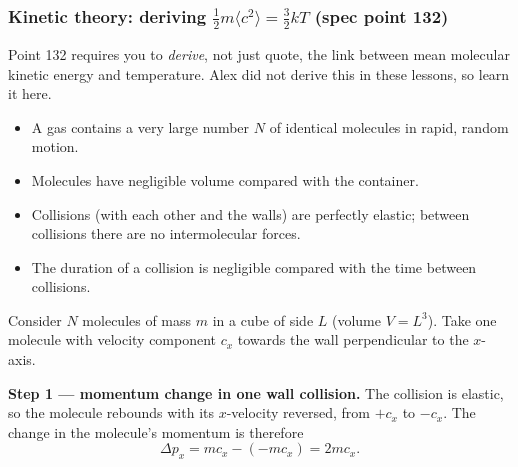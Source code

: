 \documentclass[11pt,a4paper]{article}
\begin{document}
\begin{center}
\end{center}

\subsubsection{Kinetic theory: deriving \texorpdfstring{$\tfrac{1}{2}m\langle c^2\rangle = \tfrac{3}{2}kT$}{½m<c²> = 3/2 kT} (spec point 132)}

Point 132 requires you to \emph{derive}, not just quote, the link between mean molecular
kinetic energy and temperature. Alex did not derive this in these lessons, so learn it here.

\begin{keybox}
\begin{itemize}[leftmargin=1.4em,itemsep=0pt]
  \item A gas contains a very large number $N$ of identical molecules in rapid, random
        motion.
  \item Molecules have negligible volume compared with the container.
  \item Collisions (with each other and the walls) are perfectly elastic; between
        collisions there are no intermolecular forces.
  \item The duration of a collision is negligible compared with the time between collisions.
\end{itemize}
\end{keybox}

Consider $N$ molecules of mass $m$ in a cube of side $L$ (volume $V=L^3$). Take one molecule
with velocity component $c_x$ towards the wall perpendicular to the $x$-axis.

\smallskip
\textbf{Step 1 --- momentum change in one wall collision.} The collision is elastic, so the
molecule rebounds with its $x$-velocity reversed, from $+c_x$ to $-c_x$. The change in the
molecule's momentum is therefore
\[
\Delta p_x = m c_x - (-m c_x) = 2 m c_x .
\]
\end{document}
